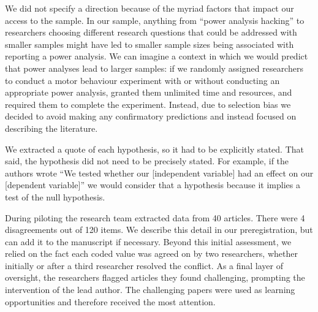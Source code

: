\documentclass[final]{article}
\begin{document}

We did not specify a direction because of the myriad factors that impact our access to the sample. In our sample, anything from ``power analysis hacking'' to researchers choosing different research questions that could be addressed with smaller samples might have led to smaller sample sizes being associated with reporting a power analysis. We can imagine a context in which we would predict that power analyses lead to larger samples: if we randomly assigned researchers to conduct a motor behaviour experiment with or without conducting an appropriate power analysis, granted them unlimited time and resources, and required them to complete the experiment. Instead, due to selection bias we decided to avoid making any confirmatory predictions and instead focused on describing the literature.


We extracted a quote of each hypothesis, so it had to be explicitly stated. That said, the hypothesis did not need to be precisely stated. For example, if the authors wrote ``We tested whether our {[}independent variable{]} had an effect on our {[}dependent variable{]}'' we would consider that a hypothesis because it implies a test of the null hypothesis.


During piloting the research team extracted data from 40 articles. There were 4 disagreements out of 120 items. We describe this detail in our preregistration, but can add it to the manuscript if necessary. Beyond this initial assessment, we relied on the fact each coded value was agreed on by two researchers, whether initially or after a third researcher resolved the conflict. As a final layer of oversight, the researchers flagged articles they found challenging, prompting the intervention of the lead author. The challenging papers were used as learning opportunities and therefore received the most attention.
\end{document}
